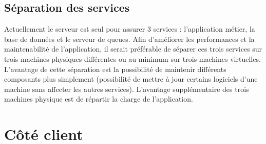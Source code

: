 

	\subsection{Séparation des services} %
	\label{sub:separation_des_services}

		Actuellement le serveur est seul pour assurer 3 services : l'application métier, la base de données et le serveur de queues. Afin d'améliorer les performances et la maintenabilité de l'application, il serait préférable de séparer ces trois services sur trois machines physiques différentes ou au minimum sur trois machines virtuelles. L'avantage de cette séparation est la possibilité de maintenir différents composants plus simplement (possibilité de mettre à jour certains logiciels d'une machine sans affecter les autres services). L'avantage supplémentaire des trois machines physique est de répartir la charge de l'application.


\section{Côté client}
